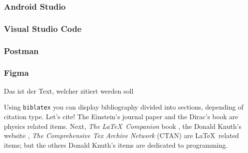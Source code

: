 \subsubsection{Android Studio}

\subsubsection{Visual Studio Code}

\subsubsection{Postman}

\subsubsection{Figma}


Das ist der Text, welcher zitiert werden soll \autocite[399]{einstein}

Using \texttt{biblatex} you can display bibliography divided into sections, 
depending of citation type. 
Let's cite! The Einstein's journal paper \autocite{einstein} and the Dirac's 
book \autocite{dirac} are physics related items. 
Next, \textit{The \LaTeX\ Companion} book \autocite{latexcompanion}, the Donald 
Knuth's website \autocite{knuthwebsite}, \textit{The Comprehensive Tex Archive 
Network} (CTAN) \autocite{ctan} are \LaTeX\ related items; but the others Donald 
Knuth's items \autocite{knuth-fa,knuth-acp} are dedicated to programming.

